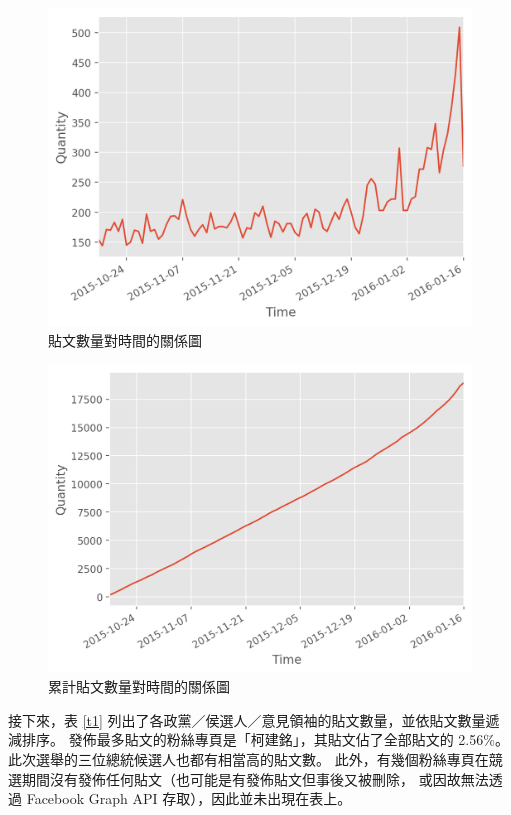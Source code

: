 \documentclass[letterpaper, 10pt, conference]{ieeeconf}   %
\begin{document}
\begin{CJK}{UTF8}{bsmi}
\begin{figure}[!htbp]
\centering
\includegraphics[width=\columnwidth]{quantity_time_graph}
\caption{貼文數量對時間的關係圖}
\label{f1}
\end{figure}

\begin{figure}[!htbp]
\centering
\includegraphics[width=\columnwidth]{quantity_time_cumulative_graph}
\caption{累計貼文數量對時間的關係圖}
\label{f2}
\end{figure}

接下來，表 \ref{t1} 列出了各政黨／侯選人／意見領袖的貼文數量，並依貼文數量遞減排序。%
發佈最多貼文的粉絲專頁是「柯建銘」，其貼文佔了全部貼文的 2.56\%。%
此次選舉的三位總統候選人也都有相當高的貼文數。%
此外，有幾個粉絲專頁在競選期間沒有發佈任何貼文（也可能是有發佈貼文但事後又被刪除，%
或因故無法透過 Facebook Graph API 存取），因此並未出現在表上。%


\end{CJK}
\end{document}
